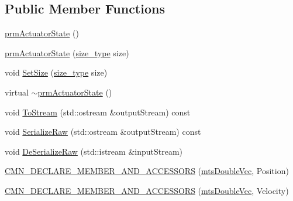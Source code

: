 \subsection*{Public Member Functions}
\begin{DoxyCompactItemize}
\item 
\hyperlink{classprm_actuator_state_a0f0d254bc1c7ab0ea05fee24c919416d}{prm\+Actuator\+State} ()
\item 
\hyperlink{classprm_actuator_state_a02db9c1e2e89740230648e96f43f14e8}{prm\+Actuator\+State} (\hyperlink{classprm_actuator_state_a1ed9ac69482dab8ddf628b1858c42631}{size\+\_\+type} size)
\item 
void \hyperlink{classprm_actuator_state_a73382164db32f41d5c6f5e2e3d0e54e9}{Set\+Size} (\hyperlink{classprm_actuator_state_a1ed9ac69482dab8ddf628b1858c42631}{size\+\_\+type} size)
\item 
virtual \hyperlink{classprm_actuator_state_a4674a03c6ce0ce24384747c3ee4e975b}{$\sim$prm\+Actuator\+State} ()
\item 
void \hyperlink{classprm_actuator_state_a2963fc3909c4bd97fc76ea02a138a0cd}{To\+Stream} (std\+::ostream \&output\+Stream) const 
\item 
void \hyperlink{classprm_actuator_state_a0dd3e2bf894a7db7a059c7488f9b8fcc}{Serialize\+Raw} (std\+::ostream \&output\+Stream) const 
\item 
void \hyperlink{classprm_actuator_state_a1c5271adc0e1ed254796622efe9c2146}{De\+Serialize\+Raw} (std\+::istream \&input\+Stream)
\end{DoxyCompactItemize}
{\bf }\par
\begin{DoxyCompactItemize}
\item 
\hyperlink{classprm_actuator_state_a4bcaf7dfe439525acae3be717330e6c1}{C\+M\+N\+\_\+\+D\+E\+C\+L\+A\+R\+E\+\_\+\+M\+E\+M\+B\+E\+R\+\_\+\+A\+N\+D\+\_\+\+A\+C\+C\+E\+S\+S\+O\+R\+S} (\hyperlink{mts_vector_8h_af69167a5dc2ad33eb93965b9387d8403}{mts\+Double\+Vec}, Position)
\end{DoxyCompactItemize}

{\bf }\par
\begin{DoxyCompactItemize}
\item 
\hyperlink{classprm_actuator_state_a260ecba553569d7e71cbbaf6c9f9194f}{C\+M\+N\+\_\+\+D\+E\+C\+L\+A\+R\+E\+\_\+\+M\+E\+M\+B\+E\+R\+\_\+\+A\+N\+D\+\_\+\+A\+C\+C\+E\+S\+S\+O\+R\+S} (\hyperlink{mts_vector_8h_af69167a5dc2ad33eb93965b9387d8403}{mts\+Double\+Vec}, Velocity)
\end{DoxyCompactItemize}

